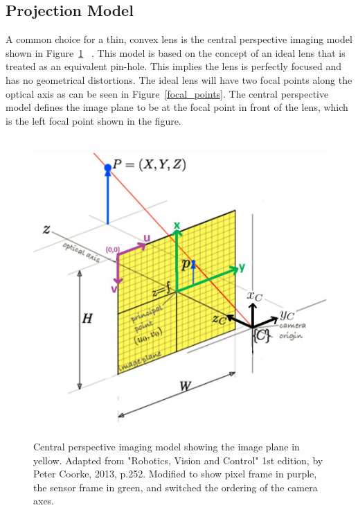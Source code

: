  \subsection{Projection Model}
 
 A common choice for a thin, convex lens is the central perspective imaging model shown in Figure~\ref{projection_model} ~\citep{Coorke:2013}. This model is based on the concept of an ideal lens that is treated as an equivalent pin-hole.  This implies the lens is perfectly focused and has no geometrical distortions.  The ideal lens will have two focal points along the optical axis as can be seen in Figure~\ref{focal_points}.  The central perspective model defines the image plane to be at the focal point in front of the lens, which is the left focal point shown in the figure.  
 
 \begin{figure}
 	\centering
     \includegraphics[height=4.5in]{figures/projection_model.jpg}
     \caption[Projection model]{Central perspective imaging model showing the image plane in yellow.  Adapted from "Robotics, Vision and Control" 1st edition, by Peter Coorke, 2013, p.252. Modified to show pixel frame in purple, the sensor frame in green, and switched the ordering of the camera axes.}
     \label{projection_model}
 \end{figure}

